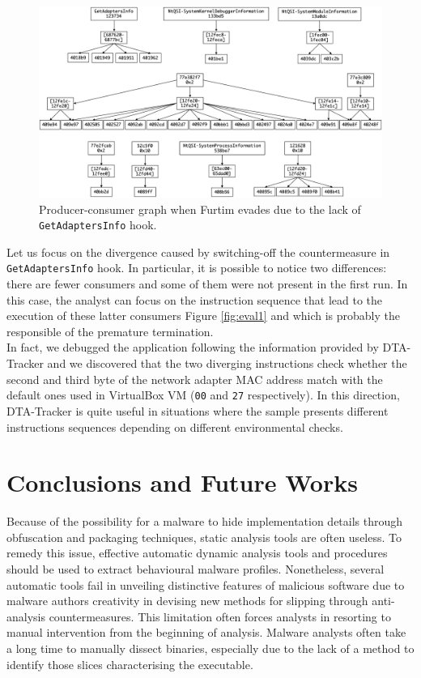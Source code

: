 \documentclass[LaM,binding=0.6cm]{sapthesis}
\begin{document}
\begin{figure}[h!]
\centering%
\includegraphics[width=\textwidth]{images/eval3_def}
\caption{Producer-consumer graph when Furtim evades due to the lack of \texttt{GetAdaptersInfo} hook.}
\end{figure}

Let us focus on the divergence caused by switching-off the countermeasure in \texttt{GetAdaptersInfo} hook. In particular, it is possible to notice two differences: there are fewer consumers and some of them were not present in the first run. In this case, the analyst can focus on the instruction sequence that lead to the execution of these latter consumers Figure \autoref{fig:eval1} and which is probably the responsible of the premature termination.\\
In fact, we debugged the application following the information provided by DTA-Tracker and we discovered that the two diverging instructions check whether the second and third byte of the network adapter MAC address match with the default ones used in VirtualBox VM (\texttt{00} and \texttt{27} respectively). In this direction, DTA-Tracker is quite useful in situations where the sample presents different instructions sequences depending on different environmental checks.

\chapter{Conclusions and Future Works}
\label{ch:futureworks}
Because of the possibility for a malware to hide implementation details through obfuscation and packaging techniques, static analysis tools are often useless. To remedy this issue, effective automatic dynamic analysis tools and procedures should be used to extract behavioural malware profiles. Nonetheless, several automatic tools fail in unveiling distinctive features of malicious software due to malware authors creativity in devising new methods for slipping through anti-analysis countermeasures. This limitation often forces analysts in resorting to manual intervention from the beginning of analysis. Malware analysts often take a long time to manually dissect binaries, especially due to the lack of a method to identify those slices characterising the executable.\\
\end{document}
